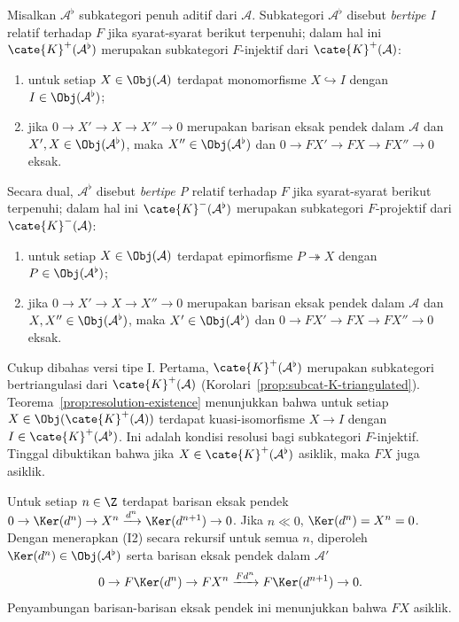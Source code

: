 \begin{definisi-proposisi}\label{prop:F-injective-criterion}
	Misalkan $\mathcal{A}^\flat$ subkategori penuh aditif dari $\mathcal{A}$.
	Subkategori $\mathcal{A}^\flat$ disebut \emph{bertipe I} relatif terhadap
	$F$ jika syarat-syarat berikut terpenuhi; dalam hal ini
	$\cate{K}^+(\mathcal{A}^\flat)$ merupakan subkategori $F$-injektif dari
	$\cate{K}^+(\mathcal{A})$:
	\begin{enumerate}[({I}1)]
		\item untuk setiap $X\in\Obj(\mathcal{A})$ terdapat monomorfisme
		$X\hookrightarrow I$ dengan $I\in\Obj(\mathcal{A}^\flat)$;
		\item jika $0\to X'\to X\to X''\to0$ merupakan barisan eksak pendek
		dalam $\mathcal{A}$ dan $X',X\in\Obj(\mathcal{A}^\flat)$, maka
		$X''\in\Obj(\mathcal{A}^\flat)$ dan
		$0\to FX'\to FX\to FX''\to0$ eksak.
	\end{enumerate}
	Secara dual, $\mathcal{A}^\flat$ disebut \emph{bertipe P} relatif terhadap
	$F$ jika syarat-syarat berikut terpenuhi; dalam hal ini
	$\cate{K}^-(\mathcal{A}^\flat)$ merupakan subkategori $F$-projektif dari
	$\cate{K}^-(\mathcal{A})$:
	\begin{enumerate}[({P}1)]
		\item untuk setiap $X\in\Obj(\mathcal{A})$ terdapat epimorfisme
		$P\twoheadrightarrow X$ dengan $P\in\Obj(\mathcal{A}^\flat)$;
		\item jika $0\to X'\to X\to X''\to0$ merupakan barisan eksak pendek
		dalam $\mathcal{A}$ dan $X,X''\in\Obj(\mathcal{A}^\flat)$, maka
		$X'\in\Obj(\mathcal{A}^\flat)$ dan
		$0\to FX'\to FX\to FX''\to0$ eksak.
	\end{enumerate}
\end{definisi-proposisi}
\begin{bukti}
	Cukup dibahas versi tipe I. Pertama,
	$\cate{K}^+(\mathcal{A}^\flat)$ merupakan subkategori bertriangulasi dari
	$\cate{K}^+(\mathcal{A})$ (Korolari~\ref{prop:subcat-K-triangulated}).
	Teorema~\ref{prop:resolution-existence} menunjukkan bahwa untuk setiap
	$X\in\Obj(\cate{K}^+(\mathcal{A}))$ terdapat kuasi-isomorfisme $X\to I$
	dengan $I\in\cate{K}^+(\mathcal{A}^\flat)$. Ini adalah kondisi resolusi
	bagi subkategori $F$-injektif. Tinggal dibuktikan bahwa jika
	$X\in\cate{K}^+(\mathcal{A}^\flat)$ asiklik, maka $FX$ juga asiklik.

	Untuk setiap $n\in\Z$ terdapat barisan eksak pendek
	$0\to\Ker(d^n)\to X^n\xrightarrow{d^n}\Ker(d^{n+1})\to0$. Jika $n\ll0$,
	$\Ker(d^n)=X^n=0$. Dengan menerapkan (I2) secara rekursif untuk semua $n$,
	diperoleh $\Ker(d^n)\in\Obj(\mathcal{A}^\flat)$ serta barisan eksak pendek
	dalam $\mathcal{A}'$
	\[ 0 \to F\Ker(d^n) \to FX^n \xrightarrow{Fd^n} F\Ker(d^{n+1}) \to 0. \]
	Penyambungan barisan-barisan eksak pendek ini menunjukkan bahwa $FX$
	asiklik.
\end{bukti}

